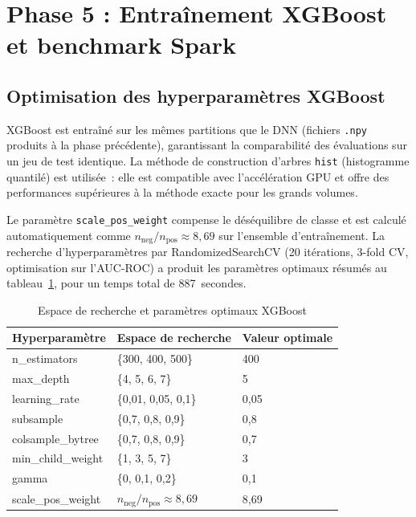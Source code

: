 \section{Phase 5 : Entraînement XGBoost et benchmark Spark}

\subsection{Optimisation des hyperparamètres XGBoost}

XGBoost est entraîné sur les mêmes partitions que le DNN (fichiers \texttt{.npy}
produits à la phase précédente), garantissant la comparabilité des évaluations sur
un jeu de test identique. La méthode de construction d'arbres \texttt{hist}
(histogramme quantilé) est utilisée~: elle est compatible avec l'accélération GPU
et offre des performances supérieures à la méthode exacte pour les grands volumes.

Le paramètre \texttt{scale\_pos\_weight} compense le déséquilibre de classe et est
calculé automatiquement comme $n_{\text{neg}}/n_{\text{pos}} \approx 8{,}69$ sur
l'ensemble d'entraînement. La recherche d'hyperparamètres par RandomizedSearchCV
(20 itérations, 3-fold CV, optimisation sur l'AUC-ROC) a produit les paramètres
optimaux résumés au tableau~\ref{tab:xgb_params_impl}, pour un temps total
de 887~secondes.

\begin{table}[H]
\centering
\caption{Espace de recherche et paramètres optimaux XGBoost}
\label{tab:xgb_params_impl}
\begin{tabular}{lll}
\toprule
\textbf{Hyperparamètre} & \textbf{Espace de recherche} & \textbf{Valeur optimale} \\
\midrule
n\_estimators      & \{300, 400, 500\}              & 400  \\
max\_depth         & \{4, 5, 6, 7\}                 & 5    \\
learning\_rate     & \{0,01, 0,05, 0,1\}            & 0,05 \\
subsample          & \{0,7, 0,8, 0,9\}              & 0,8  \\
colsample\_bytree  & \{0,7, 0,8, 0,9\}              & 0,7  \\
min\_child\_weight & \{1, 3, 5, 7\}                 & 3    \\
gamma              & \{0, 0,1, 0,2\}                & 0,1  \\
scale\_pos\_weight & $n_{\text{neg}}/n_{\text{pos}} \approx 8{,}69$ & 8,69 \\
\bottomrule
\end{tabular}
\end{table}

